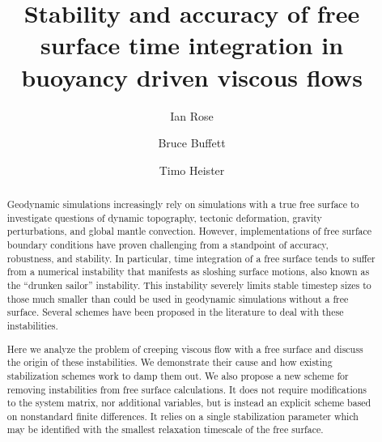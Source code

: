 \documentclass[preprint,12pt,authoryear]{elsarticle}
\begin{document}
\begin{frontmatter}



\title{Stability and accuracy of free surface time integration in buoyancy driven viscous flows}


\author{Ian Rose}
\author{Bruce Buffett}
\author{Timo Heister}



\address{}

\begin{abstract}
Geodynamic simulations increasingly rely on simulations with a true free surface to 
investigate questions of dynamic topography, tectonic deformation, gravity perturbations, and
global mantle convection. However, implementations of free surface boundary conditions 
have proven challenging from a standpoint of accuracy, robustness, and stability.
In particular, time integration of a free surface tends to suffer from a numerical instability
that manifests as sloshing surface motions, also known as the ``drunken sailor'' instability.
This instability severely limits stable timestep sizes to those much smaller than could be used
in geodynamic simulations without a free surface. 
Several schemes have been proposed in the literature to deal with these instabilities.

Here we analyze the problem of creeping viscous flow with a free surface and discuss the 
origin of these instabilities. We demonstrate their cause and how existing stabilization 
schemes work to damp them out.
We also propose a new scheme for removing instabilities from free surface calculations. 
It does not require modifications to the system matrix, nor additional variables, but is instead
an explicit scheme based on nonstandard finite differences.  It relies on a single 
stabilization parameter which may be identified with the smallest relaxation timescale of the
free surface.


\end{abstract}
\end{frontmatter}
\end{document}
